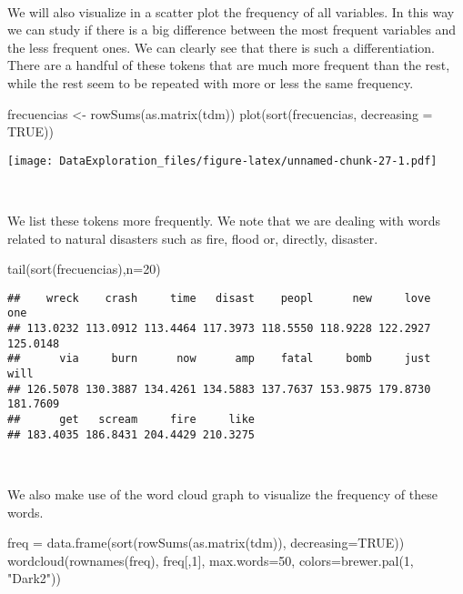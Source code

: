 \documentclass[
]{article}
\newenvironment{Shaded}{\begin{snugshade}}{\end{snugshade}}
\newcommand{\AttributeTok}[1]{\textcolor[rgb]{0.77,0.63,0.00}{#1}}
\newcommand{\ConstantTok}[1]{\textcolor[rgb]{0.00,0.00,0.00}{#1}}
\newcommand{\DecValTok}[1]{\textcolor[rgb]{0.00,0.00,0.81}{#1}}
\newcommand{\FunctionTok}[1]{\textcolor[rgb]{0.00,0.00,0.00}{#1}}
\newcommand{\NormalTok}[1]{#1}
\newcommand{\OtherTok}[1]{\textcolor[rgb]{0.56,0.35,0.01}{#1}}
\newcommand{\StringTok}[1]{\textcolor[rgb]{0.31,0.60,0.02}{#1}}
\begin{document}
~

We will also visualize in a scatter plot the frequency of all variables.
In this way we can study if there is a big difference between the most
frequent variables and the less frequent ones. We can clearly see that
there is such a differentiation. There are a handful of these tokens
that are much more frequent than the rest, while the rest seem to be
repeated with more or less the same frequency.

\begin{Shaded}
\begin{Highlighting}[]
\NormalTok{frecuencias }\OtherTok{\textless{}{-}} \FunctionTok{rowSums}\NormalTok{(}\FunctionTok{as.matrix}\NormalTok{(tdm))}
\FunctionTok{plot}\NormalTok{(}\FunctionTok{sort}\NormalTok{(frecuencias, }\AttributeTok{decreasing =} \ConstantTok{TRUE}\NormalTok{))}
\end{Highlighting}
\end{Shaded}

\texttt{[image: DataExploration\_files/figure-latex/unnamed-chunk-27-1.pdf]}

~

We list these tokens more frequently. We note that we are dealing with
words related to natural disasters such as fire, flood or, directly,
disaster.

\begin{Shaded}
\begin{Highlighting}[]
\FunctionTok{tail}\NormalTok{(}\FunctionTok{sort}\NormalTok{(frecuencias),}\AttributeTok{n=}\DecValTok{20}\NormalTok{)}
\end{Highlighting}
\end{Shaded}

\begin{verbatim}
##    wreck    crash     time   disast    peopl      new     love      one 
## 113.0232 113.0912 113.4464 117.3973 118.5550 118.9228 122.2927 125.0148 
##      via     burn      now      amp    fatal     bomb     just     will 
## 126.5078 130.3887 134.4261 134.5883 137.7637 153.9875 179.8730 181.7609 
##      get   scream     fire     like 
## 183.4035 186.8431 204.4429 210.3275
\end{verbatim}

~

We also make use of the word cloud graph to visualize the frequency of
these words.

\begin{Shaded}
\begin{Highlighting}[]
\NormalTok{freq }\OtherTok{=} \FunctionTok{data.frame}\NormalTok{(}\FunctionTok{sort}\NormalTok{(}\FunctionTok{rowSums}\NormalTok{(}\FunctionTok{as.matrix}\NormalTok{(tdm)), }\AttributeTok{decreasing=}\ConstantTok{TRUE}\NormalTok{))}
\FunctionTok{wordcloud}\NormalTok{(}\FunctionTok{rownames}\NormalTok{(freq), freq[,}\DecValTok{1}\NormalTok{], }\AttributeTok{max.words=}\DecValTok{50}\NormalTok{, }\AttributeTok{colors=}\FunctionTok{brewer.pal}\NormalTok{(}\DecValTok{1}\NormalTok{, }\StringTok{"Dark2"}\NormalTok{))}
\end{Highlighting}
\end{Shaded}
\end{document}
